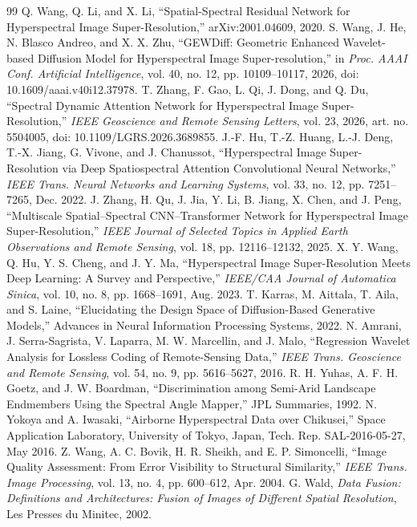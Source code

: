 \documentclass[10pt,twocolumn,letterpaper]{article}
\begin{document}
\FloatBarrier
{}
\begin{thebibliography}{99}
 Q. Wang, Q. Li, and X. Li, ``Spatial-Spectral Residual Network for Hyperspectral Image Super-Resolution,'' arXiv:2001.04609, 2020.
 S. Wang, J. He, N. Blasco Andreo, and X. X. Zhu, ``GEWDiff: Geometric Enhanced Wavelet-based Diffusion Model for Hyperspectral Image Super-resolution,'' in \textit{Proc. AAAI Conf. Artificial Intelligence}, vol. 40, no. 12, pp. 10109--10117, 2026, doi: 10.1609/aaai.v40i12.37978.
 T. Zhang, F. Gao, L. Qi, J. Dong, and Q. Du, ``Spectral Dynamic Attention Network for Hyperspectral Image Super-Resolution,'' \textit{IEEE Geoscience and Remote Sensing Letters}, vol. 23, 2026, art. no. 5504005, doi: 10.1109/LGRS.2026.3689855.
 J.-F. Hu, T.-Z. Huang, L.-J. Deng, T.-X. Jiang, G. Vivone, and J. Chanussot, ``Hyperspectral Image Super-Resolution via Deep Spatiospectral Attention Convolutional Neural Networks,'' \textit{IEEE Trans. Neural Networks and Learning Systems}, vol. 33, no. 12, pp. 7251--7265, Dec. 2022.
 J. Zhang, H. Qu, J. Jia, Y. Li, B. Jiang, X. Chen, and J. Peng, ``Multiscale Spatial--Spectral CNN--Transformer Network for Hyperspectral Image Super-Resolution,'' \textit{IEEE Journal of Selected Topics in Applied Earth Observations and Remote Sensing}, vol. 18, pp. 12116--12132, 2025.
 X. Y. Wang, Q. Hu, Y. S. Cheng, and J. Y. Ma, ``Hyperspectral Image Super-Resolution Meets Deep Learning: A Survey and Perspective,'' \textit{IEEE/CAA Journal of Automatica Sinica}, vol. 10, no. 8, pp. 1668--1691, Aug. 2023.
 T. Karras, M. Aittala, T. Aila, and S. Laine, ``Elucidating the Design Space of Diffusion-Based Generative Models,'' Advances in Neural Information Processing Systems, 2022.
 N. Amrani, J. Serra-Sagrista, V. Laparra, M. W. Marcellin, and J. Malo, ``Regression Wavelet Analysis for Lossless Coding of Remote-Sensing Data,'' \textit{IEEE Trans. Geoscience and Remote Sensing}, vol. 54, no. 9, pp. 5616--5627, 2016.
 R. H. Yuhas, A. F. H. Goetz, and J. W. Boardman, ``Discrimination among Semi-Arid Landscape Endmembers Using the Spectral Angle Mapper,'' JPL Summaries, 1992.
 N. Yokoya and A. Iwasaki, ``Airborne Hyperspectral Data over Chikusei,'' Space Application Laboratory, University of Tokyo, Japan, Tech. Rep. SAL-2016-05-27, May 2016.
 Z. Wang, A. C. Bovik, H. R. Sheikh, and E. P. Simoncelli, ``Image Quality Assessment: From Error Visibility to Structural Similarity,'' \textit{IEEE Trans. Image Processing}, vol. 13, no. 4, pp. 600--612, Apr. 2004.
 G. Wald, \textit{Data Fusion: Definitions and Architectures: Fusion of Images of Different Spatial Resolution}, Les Presses du Minitec, 2002.
\end{thebibliography}
\end{document}
